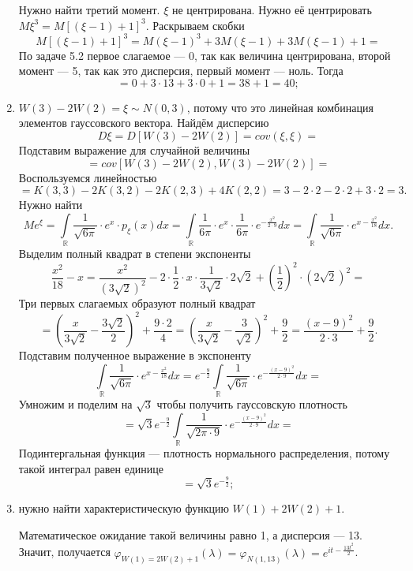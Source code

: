 \begin{enumerate}[label=\alph*)]
  Нужно найти третий момент.
  $ \xi $ не центрирована.
  Нужно её центрировать $M \xi^3 = M \left[ \left( \xi - 1 \right) + 1 \right]^3$.
  Раскрываем скобки
  $$M \left[ \left( \xi - 1 \right) + 1 \right]^3 =
    M \left( \xi - 1 \right)^3 + 3M \left( \xi - 1 \right) + 3M \left( \xi - 1 \right) + 1 =$$
  По задаче 5.2 первое слагаемое --- 0, так как величина центрирована, второй момент --- 5,
  так как это дисперсия, первый момент --- ноль.
  Тогда
  $$= 0 + 3 \cdot 13 + 3 \cdot 0 + 1 = 38 + 1 = 40;$$
  \item $W \left( 3 \right) - 2W \left( 2 \right) = \xi \sim N \left( 0, 3 \right) $,
  потому что это линейная комбинация элементов гауссовского вектора.
  Найдём дисперсию
  $$D \xi =
    D \left[ W \left( 3 \right) - 2W \left( 2 \right) \right] =
    cov \left( \xi, \xi \right) =$$
  Подставим выражение для случайной величины
  $$= cov \left[
      W \left( 3 \right) - 2W \left( 2 \right), W \left( 3 \right) - 2W \left( 2 \right) \right] =$$
  Воспользуемся линейностью
  $$= K \left( 3, 3 \right) - 2K \left( 3, 2 \right) - 2K \left( 2, 3 \right) +
    4K \left( 2, 2 \right) =
    3 - 2 \cdot 2 - 2 \cdot 2 + 3 \cdot 2 =
    3.$$
  Нужно найти
  $$Me^{ \xi } =
    \int \limits_{ \mathbb{R}}
      \frac{1}{ \sqrt{6 \pi }} \cdot e^x \cdot p_{ \xi } \left( x \right) dx =
    \int \limits_{ \mathbb{R}}
      \frac{1}{6 \pi } \cdot e^x \cdot \frac{1}{6 \pi } \cdot e^{- \frac{x^2}{2 \cdot 9}} dx =
    \int \limits_{ \mathbb{R}} \frac{1}{ \sqrt{6 \pi }} \cdot e^{x - \frac{x^2}{18}} dx.$$
  Выделим полный квадрат в степени экспоненты
  $$ \frac{x^2}{18} - x =
    \frac{x^2}{ \left( 3 \sqrt{2} \right)^2} -
    2 \cdot \frac{1}{2} \cdot x \cdot \frac{1}{3 \sqrt{2}} \cdot 2 \sqrt{2} +
    \left( \frac{1}{2} \right)^2 \cdot \left( 2 \sqrt{2} \right)^2 =$$
  Три первых слагаемых образуют полный квадрат
  $$= \left( \frac{x}{3 \sqrt{2}} - \frac{3 \sqrt{2}}{2} \right)^2 + \frac{ 9 \cdot 2}{4} =
    \left( \frac{x}{3 \sqrt{2}} - \frac{3}{ \sqrt{2}} \right)^2 + \frac{9}{2} =
    \frac{ \left( x - 9 \right)^2}{2 \cdot 3} + \frac{9}{2}.$$
  Подставим полученное выражение в экспоненту
  $$ \int \limits_{ \mathbb{R}} \frac{1}{ \sqrt{6 \pi }} \cdot e^{x - \frac{x^2}{18}} dx =
    e^{- \frac{9}{2}}
    \int \limits_{ \mathbb{R}}
      \frac{1}{ \sqrt{6 \pi }} \cdot e^{- \frac{ \left( x - 9 \right)^2}{2 \cdot 9}} dx =$$
  Умножим и поделим на $ \sqrt{3}$ чтобы получить гауссовскую плотность
  $$= \sqrt{3} e^{- \frac{9}{2}}
    \int \limits_{ \mathbb{R}}
      \frac{1}{ \sqrt{2 \pi \cdot 9}} \cdot e^{-\frac{ \left( x - 9 \right)^2}{2 \cdot 9}} dx =$$
  Подинтергальная функция --- плотность нормального распределения,
  потому такой интеграл равен единице
  $$= \sqrt{3} e^{- \frac{9}{2}};$$
  \item нужно найти характеристическую функцию $W \left( 1 \right) + 2W \left( 2 \right) + 1$.

  Математическое ожидание такой величины равно 1, а дисперсия --- 13.
  Значит, получается
  $ \varphi_{W \left( 1 \right) =
    2W \left( 2 \right) + 1} \left( \lambda \right) =
    \varphi_{N \left( 1, 13 \right) } \left( \lambda \right) =
    e^{it - \frac{13t^2}{2}}$.
\end{enumerate}
